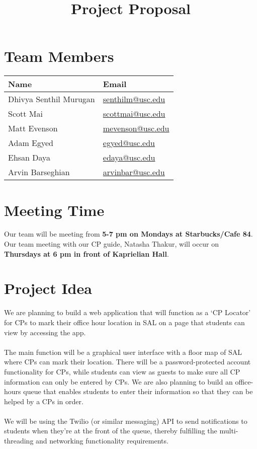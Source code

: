 \documentclass{article}
\title{Project Proposal}
\date{\vspace{-10ex}}
\begin{document}
\maketitle

\section*{Team Members}

\begin{center}
\begin{tabular}{ | l | l | }
\hline
\textbf{Name} & \textbf{Email} \\
\hline
Dhivya Senthil Murugan & \href{mailto:senthilm@usc.edu}{senthilm@usc.edu} \\
\hline
Scott Mai & \href{mailto:scottmai@usc.edu}{scottmai@usc.edu} \\
\hline
Matt Evenson & \href{mailto:mevenson@usc.edu}{mevenson@usc.edu} \\
\hline
Adam Egyed & \href{mailto:egyed@usc.edu}{egyed@usc.edu} \\
\hline
Ehsan Daya & \href{mailto:edaya@usc.edu}{edaya@usc.edu} \\
\hline
Arvin Barseghian & \href{mailto:arvinbar@usc.edu}{arvinbar@usc.edu} \\
\hline
\end{tabular}
\end{center}

\section*{Meeting Time}

Our team will be meeting from \textbf{5-7 pm on Mondays at Starbucks/Cafe 84}.
Our team meeting with our CP guide, Natasha Thakur, will occur on \textbf{Thursdays at 6 pm in front of Kaprielian Hall}.

\section*{Project Idea}

We are planning to build a web application that will function as a ‘CP Locator’ for CPs to mark
their office hour location in SAL on a page that students can view by accessing the app.
\\ \\
The main function will be a graphical user interface with a floor map of SAL where CPs
can mark their location. There will be a password-protected account functionality for CPs,
while students can view as guests to make sure all CP information can only be entered by CPs.
We are also planning to build an office-hours queue that enables students to enter their information so
that they can be helped by a CPs in order.
\\ \\
We will be using the Twilio (or similar messaging) API to send
notifications to students when they’re at the front of the queue, thereby fulfilling the multi-threading and
networking functionality requirements.
\end{document}
